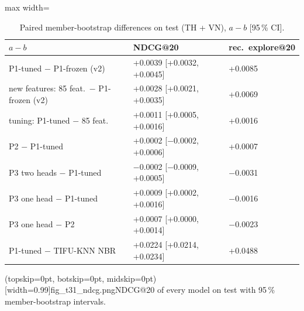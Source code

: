 \documentclass{ieeeaccess}
\begin{document}
\begin{table}[t]
\caption{Paired member-bootstrap differences on test (TH + VN), $a - b$ [95\,\% CI].}
\label{tab:paired}
\setlength{\tabcolsep}{3pt}
\centering
\begin{adjustbox}{max width=\columnwidth}
\begin{tabular}{lll}
\toprule
$a - b$ & NDCG@20 & rec.\ explore@20 \\
\midrule
P1-tuned $-$ P1-frozen (v2) & +0.0039 [+0.0032, +0.0045] & +0.0085 \\
\quad new features: 85 feat.\ $-$ P1-frozen (v2) & +0.0028 [+0.0021, +0.0035] & +0.0069 \\
\quad tuning: P1-tuned $-$ 85 feat.          & +0.0011 [+0.0005, +0.0016] & +0.0016 \\
P2 $-$ P1-tuned             & +0.0002 [$-$0.0002, +0.0006] & +0.0007 \\
P3 two heads $-$ P1-tuned   & $-$0.0002 [$-$0.0009, +0.0005] & $-$0.0031 \\
P3 one head $-$ P1-tuned    & +0.0009 [+0.0002, +0.0016] & $-$0.0016 \\
P3 one head $-$ P2          & +0.0007 [+0.0000, +0.0014] & $-$0.0023 \\
P1-tuned $-$ TIFU-KNN NBR   & +0.0224 [+0.0214, +0.0234] & +0.0488 \\
\bottomrule
\end{tabular}
\end{adjustbox}
\end{table}

\Figure[t!](topskip=0pt, botskip=0pt, midskip=0pt)[width=0.99\columnwidth]{fig_t31_ndcg.png}{NDCG@20 of every model on test with 95\,\% member-bootstrap intervals.\label{fig:t31}}
\end{document}
